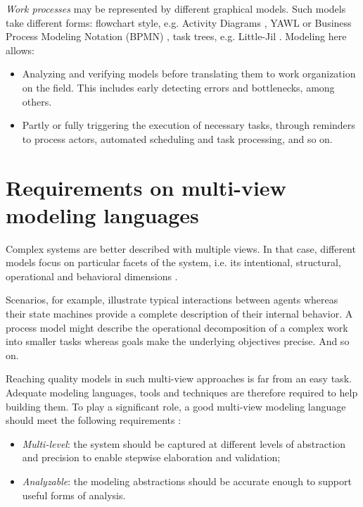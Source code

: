 
\emph{Work processes} may be represented by different graphical models. Such models take different forms: flowchart style, e.g. Activity Diagrams \cite{OMG:2004}, YAWL \cite{Vanderaalst:2005} or Business Process Modeling Notation (BPMN) \cite{OMG:2008}, task trees, e.g. Little-Jil \cite{Clarke:2008}. Modeling here allows:
\begin{itemize}
\item Analyzing and verifying models before translating them to work organization on the field. This includes early detecting errors and bottlenecks, among others.
\item Partly or fully triggering the execution of necessary tasks, through reminders to process actors, automated scheduling and task processing, and so on.
\end{itemize}

\section{Requirements on multi-view modeling languages}

Complex systems are better described with multiple views. In that case, different models focus on particular facets of the system, i.e. its intentional, structural, operational and behavioral dimensions \cite{VanLamsweerde:2009}. 

Scenarios, for example, illustrate typical interactions between agents whereas their state machines provide a complete description of their internal behavior. A process model might describe the operational decomposition of a complex work into smaller tasks whereas goals make the underlying objectives precise. And so on.

Reaching quality models in such multi-view approaches is far from an easy task. Adequate modeling languages, tools and techniques are therefore required to help building them. To play a significant role, a good multi-view modeling language should meet the following requirements \cite{VanLamsweerde:2009}:

\begin{itemize}
\item \emph{Multi-level}: the system should be captured at different levels of abstraction and precision to enable stepwise elaboration and validation;
\item \emph{Analyzable}: the modeling abstractions should be accurate enough to support useful forms of analysis.
\end{itemize}

